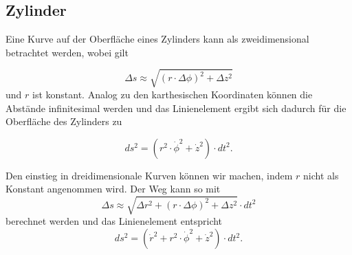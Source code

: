 %
%
%
%
\subsection{Zylinder\label{geodaeten:section:LinZylinder}}

Eine Kurve auf der Oberfläche eines Zylinders kann als zweidimensional betrachtet werden, wobei gilt

\begin{equation}
	\Delta s \approx \sqrt{(r \cdot \Delta \phi)^2 + \Delta z^2}
\end{equation}
und $r$ ist konstant.
Analog zu den karthesischen Koordinaten können die Abstände infinitesimal werden und das Linienelement ergibt sich dadurch für die Oberfläche des Zylinders zu

\begin{equation}
	ds^2 = \left(r^2 \cdot \dot{\phi}^2 +\dot{z}^2\right) \cdot dt^2 .
	\label{geodaeten:equation:Linienelemente:Kartesisch:equation2}
\end{equation}

%

Den einstieg in dreidimensionale Kurven können wir machen, indem $r$ nicht als Konstant angenommen wird.
Der Weg kann so mit
\begin{equation}
	\Delta s \approx \sqrt{\Delta r^2 + (r \cdot \Delta \phi)^2 + \Delta z^2} \cdot dt^2
\end{equation}
berechnet werden und das Linienelement entspricht 
\begin{equation}
	ds^2 = \left(\dot{r}^2 + r^2 \cdot \dot{\phi}^2 +\dot{z}^2\right) \cdot dt^2 .
\end{equation}

